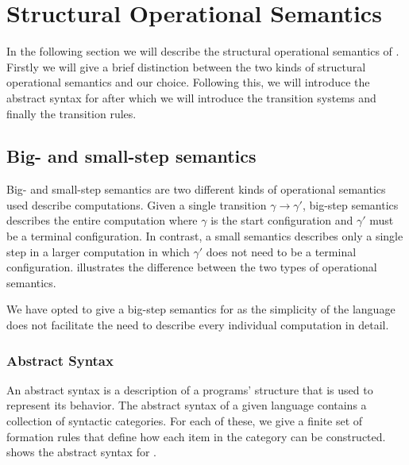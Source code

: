 \section{Structural Operational Semantics}
In the following section we will describe the structural operational semantics of \dazel{}. Firstly we will give a brief distinction between the two kinds of structural operational semantics and our choice. Following this, we will introduce the abstract syntax for \dazel{} after which we will introduce the transition systems and finally the transition rules.

\subsection{Big- and small-step semantics}
Big- and small-step semantics are two different kinds of operational semantics used describe computations.
Given a single transition $\gamma \rightarrow \gamma' $, big-step semantics describes the entire computation where $\gamma$ is the start configuration and $\gamma'$ must be a terminal configuration. 
In contrast, a small semantics describes only a single step in a larger computation in which $\gamma'$ does not need to be a terminal configuration. 
 illustrates the difference between the two types of operational semantics\cite{huttelTransitionsTreesIntroduction2010}.


We have opted to give a big-step semantics for \dazel{} as the simplicity of the language does not facilitate the need to describe every individual computation in detail. 

\subsubsection*{Abstract Syntax}
An abstract syntax is a description of a programs' structure that is used to represent its behavior. 
The abstract syntax of a given language contains a collection of syntactic categories. 
For each of these, we give a finite set of formation rules that define how each item in the category can be constructed.
 shows the abstract syntax for \dazel{}.


